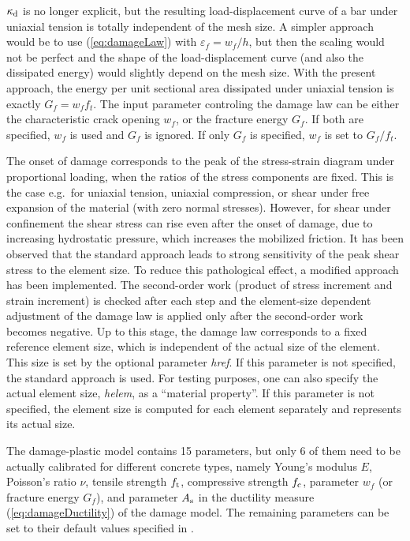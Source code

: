 \documentclass[a4paper]{article}
\newcommand{\param}[1]{{\it #1}}
\begin{document}
$\kappa_{\rm d}$ is no longer explicit, but the resulting load-displacement curve
of a bar under uniaxial tension is totally independent of the mesh size.
A simpler approach would be to use (\ref{eq:damageLaw}) with 
$\varepsilon_f = w_f/h$, but then the scaling would not be perfect and
the shape of the load-displacement curve (and also the dissipated energy)
would slightly depend on the mesh size. With the present approach,
the energy per unit sectional area dissipated under uniaxial tension 
is exactly $G_f = w_f f_t$. The input parameter controling the damage law
can be either the characteristic crack opening $w_f$, 
or the fracture energy $G_f$. If both are specified, $w_f$ is used and
$G_f$ is ignored. If only $G_f$ is specified, $w_f$ is set to $G_f/f_t$.

The onset of damage corresponds to the peak of the stress-strain diagram
under proportional loading, when the ratios of the stress components are fixed.
This is the case e.g.\ for uniaxial tension, uniaxial compression, or shear
under free expansion of the material (with zero normal stresses). However,
for shear under confinement the shear stress can rise even after the onset
of damage, due to increasing hydrostatic pressure, which increases the
mobilized friction. It has been observed that the standard approach leads
to strong sensitivity of the peak shear stress to the element size.
To reduce this pathological effect, a modified approach has been implemented.
The second-order work (product of stress increment and strain increment)
is checked after each step and the element-size dependent adjustment
of the damage law is applied only after the second-order work becomes negative.
Up to this stage, the damage law corresponds to a fixed reference element
size, which is independent of the actual size of the element.
This size is set by the optional parameter \param{href}.
If this parameter is not specified, the standard approach is used.
For testing purposes, one can also specify the actual element size,
\param{helem}, as a ``material property''. If this parameter is not
specified, the element size is computed for each element separately
and represents its actual size.  

The damage-plastic model contains 15 parameters, but only 6 of them need to be actually calibrated for different concrete types, namely Young's modulus $E$, Poisson's ratio $\nu$, tensile strength $f_{\rm t}$, compressive strength $f_{\rm c}$, parameter $w_f$ (or fracture energy $G_f$), and parameter $A_{\rm s}$ in the ductility measure (\ref{eq:damageDuctility}) of the damage model. The remaining parameters can be set to their default values specified in \cite{GraJir}.
\end{document}
